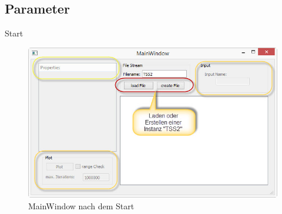 \documentclass{beamer}
\begin{document}
\subsection{Parameter}
\begin{frame}{Start}
	\begin{minipage}{1\textwidth}
		\begin{figure}[H]
			\includegraphics[width=1\linewidth]{./Pictures/MainWindow_Start}
			\caption[Startwindow]{MainWindow nach dem Start}
		\end{figure}
	\end{minipage}
\end{frame}
\end{document}
